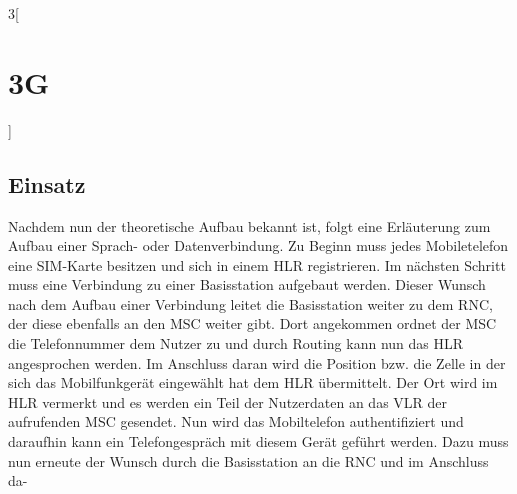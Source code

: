 \begin{multicols}{3}[\section{3G}]
\subsection*{Einsatz}

Nachdem nun der theoretische Aufbau bekannt ist, folgt eine Erläuterung zum Aufbau einer Sprach- oder Datenverbindung. Zu Beginn muss jedes Mobiletelefon eine SIM-Karte besitzen und sich in einem HLR registrieren. Im nächsten Schritt muss eine Verbindung zu einer Basisstation aufgebaut werden. Dieser Wunsch nach dem Aufbau einer Verbindung leitet die Basisstation weiter zu dem RNC, der diese ebenfalls an den MSC weiter gibt. Dort angekommen ordnet der MSC die Telefonnummer dem Nutzer zu und durch Routing kann nun das HLR angesprochen werden. Im Anschluss daran wird die Position bzw. die Zelle in der sich das Mobilfunkgerät eingewählt hat dem HLR übermittelt. Der Ort wird im HLR vermerkt und es werden ein Teil der Nutzerdaten an das VLR der aufrufenden MSC gesendet. Nun wird das Mobiltelefon authentifiziert und daraufhin kann ein Telefongespräch mit diesem Gerät geführt werden. Dazu muss nun erneute der Wunsch durch die Basisstation an die RNC und im Anschluss da-

\end{multicols}
\newpage
